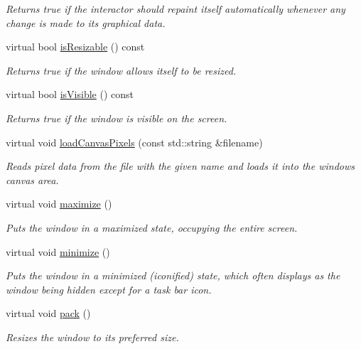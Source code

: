 \begin{DoxyCompactItemize}
\begin{DoxyCompactList}\small\item\em Returns true if the interactor should repaint itself automatically whenever any change is made to its graphical data. \end{DoxyCompactList}\item 
virtual bool \mbox{\hyperlink{classGWindow_a2afeea3d26d063fa35c104e73275cec7}{is\+Resizable}} () const
\begin{DoxyCompactList}\small\item\em Returns true if the window allows itself to be resized. \end{DoxyCompactList}\item 
virtual bool \mbox{\hyperlink{classGWindow_a9d8a6cfb13917785c143e74d40e4e2be}{is\+Visible}} () const
\begin{DoxyCompactList}\small\item\em Returns true if the window is visible on the screen. \end{DoxyCompactList}\item 
virtual void \mbox{\hyperlink{classGWindow_ae2462f15e288c06c5136e31a8ac8151c}{load\+Canvas\+Pixels}} (const std\+::string \&filename)
\begin{DoxyCompactList}\small\item\em Reads pixel data from the file with the given name and loads it into the window\textquotesingle{}s canvas area. \end{DoxyCompactList}\item 
virtual void \mbox{\hyperlink{classGWindow_a1aa481996525792213f28d91fbb4894b}{maximize}} ()
\begin{DoxyCompactList}\small\item\em Puts the window in a maximized state, occupying the entire screen. \end{DoxyCompactList}\item 
virtual void \mbox{\hyperlink{classGWindow_a85ffaebe489c0ecf8051715ecf59babb}{minimize}} ()
\begin{DoxyCompactList}\small\item\em Puts the window in a minimized (iconified) state, which often displays as the window being hidden except for a task bar icon. \end{DoxyCompactList}\item 
virtual void \mbox{\hyperlink{classGWindow_a915ffc82b17862ab1d2a466a79d23a3f}{pack}} ()
\begin{DoxyCompactList}\small\item\em Resizes the window to its preferred size. \end{DoxyCompactList}\item 

\end{DoxyCompactItemize}
